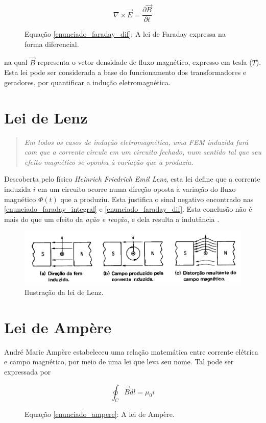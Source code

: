 \documentclass[]{report}
\begin{document}
\begin{figure}[!ht]
\begin{equation}
\label{enunciado_faraday_dif}
\nabla \times \vec{E} = \frac{\partial \vec{B}}{\partial t}
\end{equation}
\caption*{Equação \ref{enunciado_faraday_dif}: A lei de Faraday expressa na forma diferencial.}
\end{figure}

na qual $\vec{B}$ representa o vetor densidade de fluxo magnético, expresso em tesla ($T$). Esta lei pode ser considerada a base do funcionamento dos transformadores e geradores, por quantificar a indução eletromagnética.
\chapter{Lei de Lenz}
\begin{quote}
\begin{flushright}
\textit{Em todos os casos de indução eletromagnética, uma FEM induzida fará com que a corrente circule em um circuito fechado, num sentido tal que seu efeito magnético se oponha à variação que a produziu.} \cite{kosow}
\end{flushright}

\end{quote}

Descoberta pelo físico \textit{Heinrich Friedrich Emil Lenz}, esta lei define que a corrente induzida $i$ em um circuito ocorre numa direção oposta à variação do fluxo magnético $\Phi(t)$ que a produziu. \cite{ulaby} Esta justifica o sinal negativo encontrado nas \ref{enunciado_faraday_integral} e \ref{enunciado_faraday_dif}. Esta conclusão não é mais do que um efeito da \textit{ação e reação}, e dela resulta a indutância \cite{kosow}.

\begin{figure}[htb]
\centering
\includegraphics[scale=0.5]{ilustra_lenz}
\caption{Ilustração da lei de Lenz. \cite{kosow}}
\end{figure}
\chapter{Lei de Ampère}
André Marie Ampère estabeleceu uma relação matemática entre corrente elétrica e campo magnético, por meio de uma lei que leva seu nome. Tal pode ser expressada por
\begin{figure}[!ht]
\begin{equation}
\label{enunciado_ampere}
\oint_C \vec{B} dl = \mu_0 i 
\end{equation}
\caption*{Equação \ref{enunciado_ampere}: A lei de Ampère.}
\end{figure}
\end{document}
